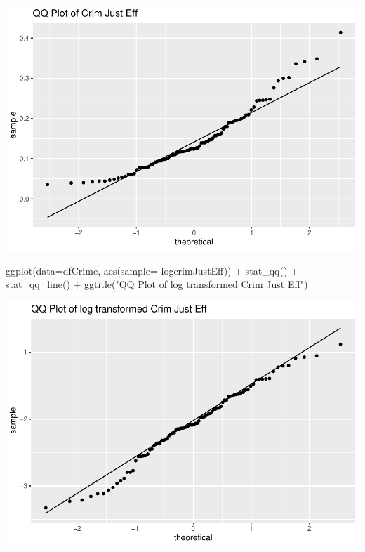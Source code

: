 \documentclass[]{article}
\newenvironment{Shaded}{}{}
\newcommand{\DataTypeTok}[1]{#1}
\newcommand{\KeywordTok}[1]{\textcolor[rgb]{0.00,0.00,1.00}{#1}}
\newcommand{\NormalTok}[1]{#1}
\newcommand{\OperatorTok}[1]{#1}
\newcommand{\StringTok}[1]{\textcolor[rgb]{0.00,0.50,0.50}{#1}}
\begin{document}
\includegraphics{Bagnard_Gaustad_Hartman_Leung_Lab_3_files/figure-latex/unnamed-chunk-76-1.pdf}

\begin{Shaded}
\begin{Highlighting}[]
\KeywordTok{ggplot}\NormalTok{(}\DataTypeTok{data=}\NormalTok{dfCrime, }\KeywordTok{aes}\NormalTok{(}\DataTypeTok{sample=}\NormalTok{ logcrimJustEff)) }\OperatorTok{+}\StringTok{ }\KeywordTok{stat_qq}\NormalTok{() }\OperatorTok{+}\StringTok{ }\KeywordTok{stat_qq_line}\NormalTok{() }\OperatorTok{+}\StringTok{ }
\KeywordTok{ggtitle}\NormalTok{(}\StringTok{"QQ Plot of log transformed Crim Just Eff"}\NormalTok{)}
\end{Highlighting}
\end{Shaded}

\includegraphics{Bagnard_Gaustad_Hartman_Leung_Lab_3_files/figure-latex/unnamed-chunk-77-1.pdf}
\end{document}
